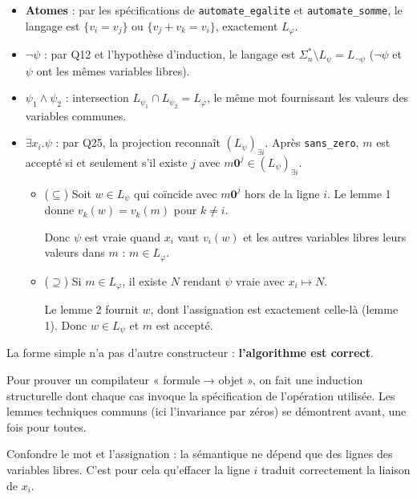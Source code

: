 \documentclass[11pt,a4paper]{article}
\providecommand{\tightlist}{\setlength{\itemsep}{0pt}\setlength{\parskip}{0pt}}
\begin{document}
\begin{itemize}
\tightlist
\item
  \textbf{Atomes} : par les spécifications de \texttt{automate\_egalite} et \texttt{automate\_somme}, le langage est \(\{v_i=v_j\}\) ou \(\{v_j+v_k=v_i\}\), exactement \(L_\varphi\).
\item
  \textbf{\(\neg\psi\)} : par Q12 et l'hypothèse d'induction, le langage est \(\Sigma_n^*\setminus L_\psi=L_{\neg\psi}\) (\(\neg\psi\) et \(\psi\) ont les mêmes variables libres).
\item
  \textbf{\(\psi_1\wedge\psi_2\)} : intersection \(L_{\psi_1}\cap L_{\psi_2}=L_\varphi\), le même mot fournissant les valeurs des variables communes.
\item
  \textbf{\(\exists x_i.\psi\)} : par Q25, la projection reconnaît \((L_\psi)_{\exists i}\). Après \texttt{sans\_zero}, \(m\) est accepté si et seulement s'il existe \(j\) avec \(m{\mathbf{0}}^j\in(L_\psi)_{\exists i}\).

  \begin{itemize}
  \item
    (\(\subseteq\)) Soit \(w\in L_\psi\) qui coïncide avec \(m{\mathbf{0}}^j\) hors de la ligne \(i\). Le lemme 1 donne \(v_k(w)=v_k(m)\) pour \(k\ne i\).

    Donc \(\psi\) est vraie quand \(x_i\) vaut \(v_i(w)\) et les autres variables libres leurs valeurs dans \(m\) : \(m\in L_\varphi\).
  \item
    (\(\supseteq\)) Si \(m\in L_\varphi\), il existe \(N\) rendant \(\psi\) vraie avec \(x_i\mapsto N\).

    Le lemme 2 fournit \(w\), dont l'assignation est exactement celle-là (lemme 1). Donc \(w\in L_\psi\) et \(m\) est accepté.
  \end{itemize}
\end{itemize}

La forme simple n'a pas d'autre constructeur : \textbf{l'algorithme est correct}.

\begin{methode}

Pour prouver un compilateur « formule → objet », on fait une induction structurelle dont chaque cas invoque la spécification de l'opération utilisée. Les lemmes techniques communs (ici l'invariance par zéros) se démontrent avant, une fois pour toutes.

\end{methode}

\begin{piege}

Confondre le mot et l'assignation : la sémantique ne dépend que des lignes des variables libres. C'est pour cela qu'effacer la ligne \(i\) traduit correctement la liaison de \(x_i\).

\end{piege}
\end{document}
